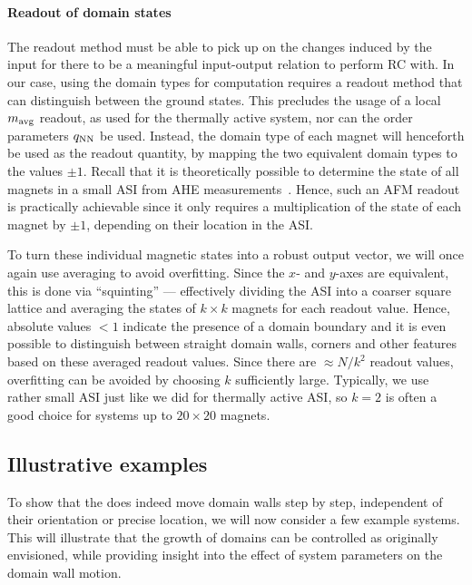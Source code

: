 \paragraph{Readout of domain states}
The readout method must be able to pick up on the changes induced by the input for there to be a meaningful input-output relation to perform RC with.
In our case, using the domain types for computation requires a readout method that can distinguish between the ground states.
This precludes the usage of a local $m_\mathrm{avg}$ readout, as used for the thermally active system, nor can the order parameters $q_\mathrm{NN}$ be used.
Instead, the domain type of each magnet will henceforth be used as the readout quantity, by mapping the two equivalent domain types to the values $\pm 1$.
Recall that it is theoretically possible to determine the state of all magnets in a small ASI from AHE measurements~\cite[Supp. 7]{KUR-24}.
Hence, such an AFM readout is practically achievable since it only requires a multiplication of the state of each magnet by $\pm 1$, depending on their location in the ASI. \par
To turn these individual magnetic states into a robust output vector, we will once again use averaging to avoid overfitting.
Since the $x$- and $y$-axes are equivalent, this is done via ``squinting'' --- effectively dividing the ASI into a coarser square lattice and averaging the states of $k \times k$ magnets for each readout value.
Hence, absolute values $<1$ indicate the presence of a domain boundary and it is even possible to distinguish between straight domain walls, corners and other features based on these averaged readout values.
Since there are $\approx N/k^2$ readout values, overfitting can be avoided by choosing $k$ sufficiently large.
Typically, we use rather small ASI just like we did for thermally active ASI, so $k=2$ is often a good choice for systems up to $20 \times 20$ magnets.

\subsection{Illustrative examples}
To show that the  does indeed move domain walls step by step, independent of their orientation or precise location, we will now consider a few example systems.
This will illustrate that the growth of domains can be controlled as originally envisioned, while providing insight into the effect of system parameters on the domain wall motion.

